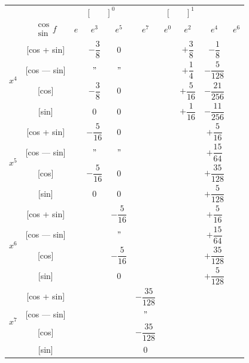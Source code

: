 \documentclass[11pt,a4paper]{book}
\begin{document}
\begin{center}
\small
\begin{tabular}{|c|c|c|c|c|c|c|c|c|}
\hline
& &  &  \\
& $\begin{smallmatrix} \cos \\ \sin \end{smallmatrix} f$ & $e$ & $e^3$ & $e^5$ & $e^7$ & $e^0$ & $e^2$ & $e^4$ & $e^6$ \\
\hline
{} & [cos + sin] & & $-\dfrac{3}{8}$ & $0$ & & & $+\dfrac{3}{8}$ & $-\dfrac{1}{8}$ \\
& [cos --- sin] & & $"$ & $"$ & & & $+\dfrac{1}{4}$ & $-\dfrac{5}{128}$ \\
& [cos] & & $-\dfrac{3}{8}$ & $0$ & & & $+\dfrac{5}{16}$ & $-\dfrac{21}{256}$ \\
& [sin] & & $0$ & $0$ & & & $+\dfrac{1}{16}$ & $-\dfrac{11}{256}$ \\
\hline
{} & [cos + sin] & & $-\dfrac{5}{16}$ & $0$ & & & & $+\dfrac{5}{16}$ \\
& [cos --- sin] & & $"$ & $"$ & & & & $+\dfrac{15}{64}$ \\
& [cos] & & $-\dfrac{5}{16}$ & $0$ & & & & $+\dfrac{35}{128}$ \\
& [sin] & & $0$ & $0$ & & & & $+\dfrac{5}{128}$ \\
\hline
{} & [cos + sin] & & & $-\dfrac{5}{16}$ & & & & $+\dfrac{5}{16}$ \\
& [cos --- sin] & & & $"$ & & & & $+\dfrac{15}{64}$ \\
& [cos] & & & $-\dfrac{5}{16}$ & & & & $+\dfrac{35}{128}$ \\
& [sin] & & & $0$ & & & & $+\dfrac{5}{128}$ \\
\hline
{} & [cos + sin] & & & & $-\dfrac{35}{128}$ & & & \\
& [cos --- sin] & & & & $"$ & & & \\
& [cos] & & & & $-\dfrac{35}{128}$ & & & \\
& [sin] & & & & $0$ & & & \\
\hline
\end{tabular}
\end{center}

\vspace{1em}

\end{document}
